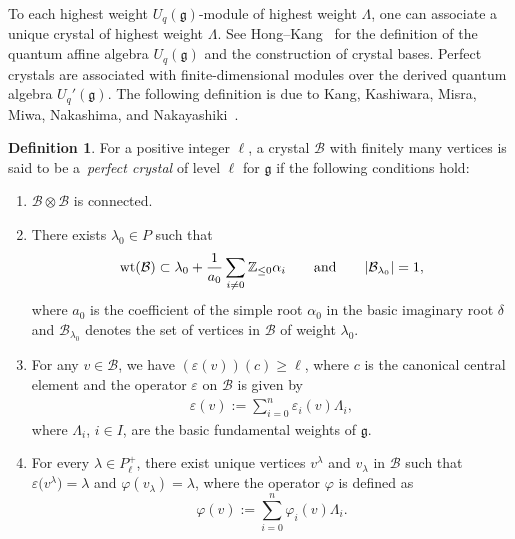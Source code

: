 \documentclass[10pt,a4paper]{amsart}
\numberwithin{equation}{section}
\theoremstyle{definition}
\newtheorem{Definition}[Theorem]{Definition}
\begin{document}
To each highest weight $U_q(\mathfrak{g})$-module of highest weight $\Lambda$, one can associate a unique crystal of highest weight $\Lambda$. See Hong--Kang~\cite[Chapters~3 and~4]{HK02} for the definition of the quantum affine algebra $U_q(\mathfrak{g})$ and the construction of crystal bases. Perfect crystals are associated with finite-dimensional modules over the derived quantum algebra $U_q'(\mathfrak{g})$. The following definition is due to Kang, Kashiwara, Misra, Miwa, Nakashima, and Nakayashiki~\cite{KMN92}.

\begin{Definition}\label{def:perfectcrystal} For a positive integer $\ell$, a crystal $\mathcal{B}$ with finitely many vertices is said to be a~\emph{perfect crystal} of level $\ell$ for $\mathfrak{g}$ if the following conditions hold:
\begin{enumerate}[label=(\roman*)]\itemsep=0pt
 \item $\mathcal{B} \otimes \mathcal{B}$ is connected.
 \item There exists $\lambda_0\in P$ such that
 \begin{align*}
 {\rm wt}(\mathcal{B}) \subset \lambda_0 + \frac{1}{a_0} \sum_{i \neq 0} \mathbb{Z}_{\leq 0} \alpha_i
 \qquad \text{and} \qquad
 |\mathcal{B}_{\lambda_0}| = 1,
 \end{align*}
 where $a_0$ is the coefficient of the simple root $\alpha_0$ in the basic imaginary root $\delta$ and $\mathcal{B}_{\lambda_0}$ denotes the set of vertices in $\mathcal{B}$ of weight $\lambda_0$.
 \item For any $v \in \mathcal{B}$, we have $ (\varepsilon(v) )(c) \geq \ell$, where $c$ is the canonical central element and the operator $\varepsilon$ on $\mathcal{B}$ is given by
 \begin{align*}
 \varepsilon(v) := \sum_{i=0}^n \varepsilon_i(v) \Lambda_i,
 \end{align*}
 where $\Lambda_i$, $i\in I$, are the basic fundamental weights of $\mathfrak{g}$.
 \item For every $\lambda\in P_\ell^+$, there exist unique vertices $v^\lambda$ and $v_\lambda$ in $\mathcal{B}$ such that $\varepsilon\bigl(v^\lambda\bigr) = \lambda$ and $\varphi(v_\lambda) = \lambda$, where the operator $\varphi$ is defined as
 \[\varphi(v) := \sum_{i=0}^n \varphi_i(v) \Lambda_i.\]
\end{enumerate}
\end{Definition}
\end{document}
